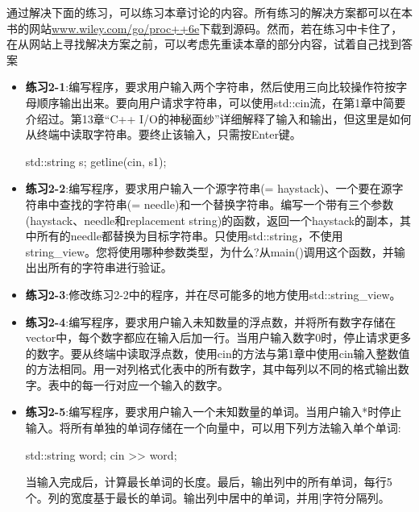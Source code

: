 
通过解决下面的练习，可以练习本章讨论的内容。所有练习的解决方案都可以在本书的网站\url{www.wiley.com/go/proc++6e}下载到源码。然而，若在练习中卡住了，在从网站上寻找解决方案之前，可以考虑先重读本章的部分内容，试着自己找到答案

\begin{itemize}
\item
\textbf{练习2-1}:编写程序，要求用户输入两个字符串，然后使用三向比较操作符按字母顺序输出出来。要向用户请求字符串，可以使用std::cin流，在第1章中简要介绍过。第13章“C++ I/O的神秘面纱”详细解释了输入和输出，但这里是如何从终端中读取字符串。要终止该输入，只需按Enter键。

\begin{cpp}
std::string s;
getline(cin, s1);
\end{cpp}

\item
\textbf{练习2-2}:编写程序，要求用户输入一个源字符串(= haystack)、一个要在源字符串中查找的字符串(= needle)和一个替换字符串。编写一个带有三个参数(haystack、needle和replacement string)的函数，返回一个haystack的副本，其中所有的needle都替换为目标字符串。只使用std::string，不使用string\_view。您将使用哪种参数类型，为什么?从main()调用这个函数，并输出出所有的字符串进行验证。

\item
\textbf{练习2-3}:修改练习2-2中的程序，并在尽可能多的地方使用std::string\_view。

\item
\textbf{练习2-4}:编写程序，要求用户输入未知数量的浮点数，并将所有数字存储在vector中，每个数字都应在输入后加一行。当用户输入数字0时，停止请求更多的数字。要从终端中读取浮点数，使用cin的方法与第1章中使用cin输入整数值的方法相同。用一对列格式化表中的所有数字，其中每列以不同的格式输出数字。表中的每一行对应一个输入的数字。

\item
\textbf{练习2-5}:编写程序，要求用户输入一个未知数量的单词。当用户输入*时停止输入。将所有单独的单词存储在一个向量中，可以用下列方法输入单个单词:

\begin{cpp}
std::string word;
cin >> word;
\end{cpp}

当输入完成后，计算最长单词的长度。最后，输出列中的所有单词，每行5个。列的宽度基于最长的单词。输出列中居中的单词，并用|字符分隔列。
\end{itemize}


